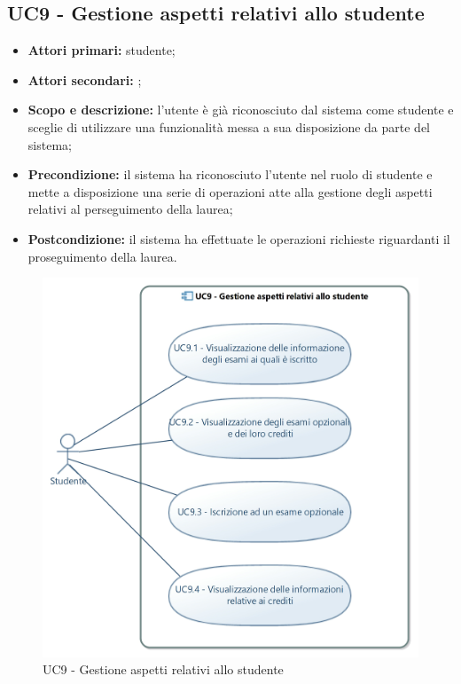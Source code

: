 \documentclass[AnalisiDeiRequisiti.tex]{subfiles}
\begin{document}
\subsection{UC9 - Gestione aspetti relativi allo studente}
\begin{itemize}
	\item \textbf{Attori primari:} studente;
	\item \textbf{Attori secondari:} ;
	\item \textbf{Scopo e descrizione:} l'utente è già riconosciuto dal sistema come studente e sceglie di utilizzare una funzionalità messa a sua disposizione da parte del sistema;
	\item \textbf{Precondizione:} il sistema ha riconosciuto l'utente nel ruolo di studente e mette a disposizione una serie di operazioni atte alla gestione degli aspetti relativi al perseguimento della laurea;
	\item \textbf{Postcondizione:} il sistema ha effettuate le operazioni richieste riguardanti il proseguimento della laurea.
\end{itemize}
\begin{figure}[H]
	\centering
	\includegraphics[width=0.8\linewidth]{UC9.jpg}
	\caption{UC9 - Gestione aspetti relativi allo studente}
	\label{fig:UC9 - Gestione aspetti relativi allo studente}
\end{figure}
\end{document}
